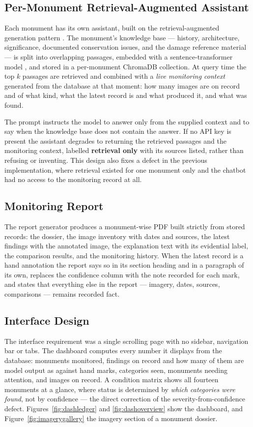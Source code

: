 \documentclass[a4paper,12pt,oneside]{book}
\begin{document}
\subsection{Per-Monument Retrieval-Augmented Assistant}
Each monument has its own assistant, built on the retrieval-augmented generation pattern \cite{lewis2020rag}. The monument's knowledge base --- history, architecture, significance, documented conservation issues, and the damage reference material --- is split into overlapping passages, embedded with a sentence-transformer model \cite{reimers2019sbert}, and stored in a per-monument ChromaDB collection. At query time the top $k$ passages are retrieved and combined with a \textit{live monitoring context} generated from the database at that moment: how many images are on record and of what kind, what the latest record is and what produced it, and what was found.

The prompt instructs the model to answer only from the supplied context and to say when the knowledge base does not contain the answer. If no API key is present the assistant degrades to returning the retrieved passages and the monitoring context, labelled \textbf{retrieval only} with its sources listed, rather than refusing or inventing. This design also fixes a defect in the previous implementation, where retrieval existed for one monument only and the chatbot had no access to the monitoring record at all.

\subsection{Monitoring Report}
The report generator produces a monument-wise PDF built strictly from stored records: the dossier, the image inventory with dates and sources, the latest findings with the annotated image, the explanation text with its evidential label, the comparison results, and the monitoring history. When the latest record is a hand annotation the report says so in its section heading and in a paragraph of its own, replaces the confidence column with the note recorded for each mark, and states that everything else in the report --- imagery, dates, sources, comparisons --- remains recorded fact.

\subsection{Interface Design}
The interface requirement was a single scrolling page with no sidebar, navigation bar or tabs. The dashboard computes every number it displays from the database: monuments monitored, findings on record and how many of them are model output as against hand marks, categories seen, monuments needing attention, and images on record. A condition matrix shows all fourteen monuments at a glance, where status is determined by \textit{which categories were found}, not by confidence --- the direct correction of the severity-from-confidence defect. Figures~\ref{fig:dashledger} and \ref{fig:dashoverview} show the dashboard, and Figure~\ref{fig:imagerygallery} the imagery section of a monument dossier.
\end{document}
